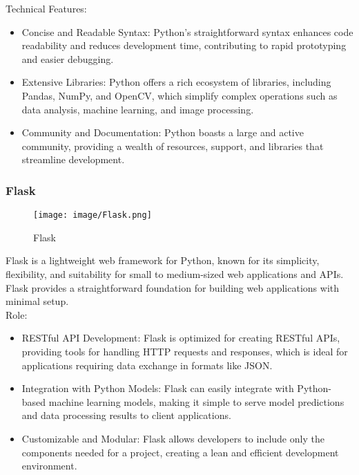 \documentclass[conference]{IEEEtran}
\begin{document}
Technical Features:
\begin{itemize}
    \item Concise and Readable Syntax: Python’s straightforward syntax enhances code readability and reduces development time, contributing to rapid prototyping and easier debugging.\\
    \item Extensive Libraries: Python offers a rich ecosystem of libraries, including Pandas, NumPy, and OpenCV, which simplify complex operations such as data analysis, machine learning, and image processing.\\
    \item Community and Documentation: Python boasts a large and active community, providing a wealth of resources, support, and libraries that streamline development.\\
\end{itemize}

\subsubsection{Flask}
\begin{figure}[h!]
    \centering
    \texttt{[image: image/Flask.png]}
    \caption{Flask}
    \label{fig:enter-label}
\end{figure}

\noindent Flask is a lightweight web framework for Python, known for its simplicity, flexibility, and suitability for small to medium-sized web applications and APIs. Flask provides a straightforward foundation for building web applications with minimal setup.\\

Role:
\begin{itemize}
    \item RESTful API Development: Flask is optimized for creating RESTful APIs, providing tools for handling HTTP requests and responses, which is ideal for applications requiring data exchange in formats like JSON.\\
    \item Integration with Python Models: Flask can easily integrate with Python-based machine learning models, making it simple to serve model predictions and data processing results to client applications.\\
    \item Customizable and Modular: Flask allows developers to include only the components needed for a project, creating a lean and efficient development environment.\\
\end{itemize}
\end{document}
